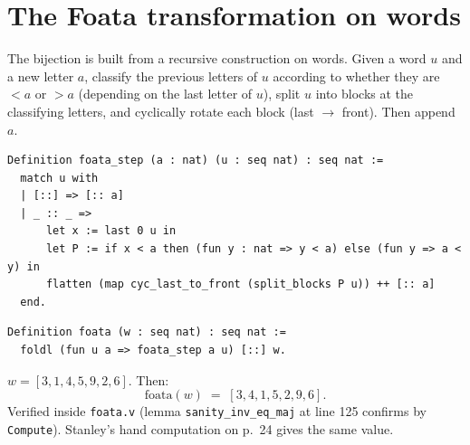 \section{The Foata transformation on words}

The bijection is built from a recursive construction on words. Given
a word $u$ and a new letter $a$, classify the previous letters of
$u$ according to whether they are $< a$ or $> a$ (depending on the
last letter of $u$), split $u$ into blocks at the classifying
letters, and cyclically rotate each block (last $\to$ front). Then
append $a$.

\begin{lstlisting}[language=Rocq]
Definition foata_step (a : nat) (u : seq nat) : seq nat :=
  match u with
  | [::] => [:: a]
  | _ :: _ =>
      let x := last 0 u in
      let P := if x < a then (fun y : nat => y < a) else (fun y => a < y) in
      flatten (map cyc_last_to_front (split_blocks P u)) ++ [:: a]
  end.
\end{lstlisting}


\begin{lstlisting}[language=Rocq]
Definition foata (w : seq nat) : seq nat :=
  foldl (fun u a => foata_step a u) [::] w.
\end{lstlisting}


\begin{example}
  $w = [3,1,4,5,9,2,6]$. Then:
  \[
    \mathrm{foata}(w) \;=\; [3, 4, 1, 5, 2, 9, 6].
  \]
  Verified inside \texttt{foata.v} (lemma \texttt{sanity\_inv\_eq\_maj}
  at line 125 confirms by \texttt{Compute}). Stanley's hand
  computation on p.~24 gives the same value.
\end{example}

